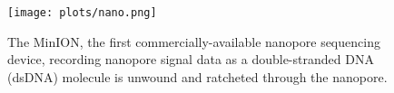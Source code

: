 \begin{figure}
\centering
\texttt{[image: plots/nano.png]}
\caption[The MinION recording nanopore signal data as a DNA molecule is unwound and ratcheted through the nanopore.]{\label{fig:nano}The MinION, the first commercially-available nanopore sequencing device, recording nanopore signal data as a double-stranded DNA (dsDNA) molecule is unwound and ratcheted through the nanopore\protect\footnotemark[1].}
\end{figure}
